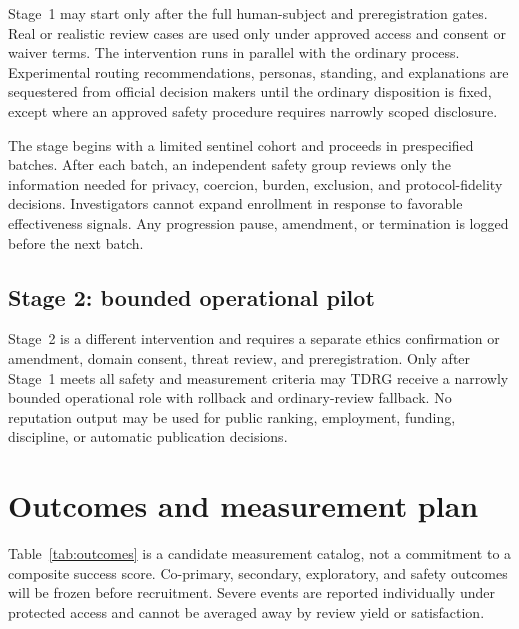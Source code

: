 \documentclass[11pt]{article}
\newcommand{\tdrg}{TDRG}
\begin{document}
Stage~1 may start only after the full human-subject and preregistration gates. Real
or realistic review cases are used only under approved access and consent or waiver
terms. The intervention runs in parallel with the ordinary process. Experimental
routing recommendations, personas, standing, and explanations are sequestered from
official decision makers until the ordinary disposition is fixed, except where an
approved safety procedure requires narrowly scoped disclosure.

The stage begins with a limited sentinel cohort and proceeds in prespecified
batches. After each batch, an independent safety group reviews only the information
needed for privacy, coercion, burden, exclusion, and protocol-fidelity decisions.
Investigators cannot expand enrollment in response to favorable effectiveness
signals. Any progression pause, amendment, or termination is logged before the
next batch.

\subsection{Stage 2: bounded operational pilot}

Stage~2 is a different intervention and requires a separate ethics confirmation or
amendment, domain consent, threat review, and preregistration. Only after Stage~1
meets all safety and measurement criteria may \tdrg{} receive a narrowly bounded
operational role with rollback and ordinary-review fallback. No reputation output
may be used for public ranking, employment, funding, discipline, or automatic
publication decisions.

\section{Outcomes and measurement plan}

Table~\ref{tab:outcomes} is a candidate measurement catalog, not a commitment to a
composite success score. Co-primary, secondary, exploratory, and safety outcomes
will be frozen before recruitment. Severe events are reported individually under
protected access and cannot be averaged away by review yield or satisfaction.
\end{document}

